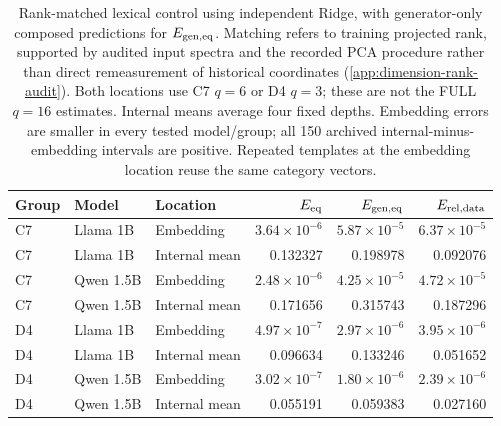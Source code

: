 \begin{table}[t]
\caption{Rank-matched lexical control using independent Ridge, with generator-only composed predictions for $E_{\rm gen,eq}$. Matching refers to training projected rank, supported by audited input spectra and the recorded PCA procedure rather than direct remeasurement of historical coordinates (\cref{app:dimension-rank-audit}). Both locations use C7 $q=6$ or D4 $q=3$; these are not the FULL $q=16$ estimates. Internal means average four fixed depths. Embedding errors are smaller in every tested model/group; all 150 archived internal-minus-embedding intervals are positive. Repeated templates at the embedding location reuse the same category vectors.}
\label{tab:lexical-control}
\centering
\small
\begin{tabular}{lllrrr}
\toprule
Group & Model & Location & $E_{\rm eq}$ & $E_{\rm gen,eq}$ & $E_{\rm rel,data}$ \\
\midrule
C7 & Llama 1B & Embedding & $3.64\!\times\!10^{-6}$ & $5.87\!\times\!10^{-5}$ & $6.37\!\times\!10^{-5}$ \\
C7 & Llama 1B & Internal mean & 0.132327 & 0.198978 & 0.092076 \\
C7 & Qwen 1.5B & Embedding & $2.48\!\times\!10^{-6}$ & $4.25\!\times\!10^{-5}$ & $4.72\!\times\!10^{-5}$ \\
C7 & Qwen 1.5B & Internal mean & 0.171656 & 0.315743 & 0.187296 \\
D4 & Llama 1B & Embedding & $4.97\!\times\!10^{-7}$ & $2.97\!\times\!10^{-6}$ & $3.95\!\times\!10^{-6}$ \\
D4 & Llama 1B & Internal mean & 0.096634 & 0.133246 & 0.051652 \\
D4 & Qwen 1.5B & Embedding & $3.02\!\times\!10^{-7}$ & $1.80\!\times\!10^{-6}$ & $2.39\!\times\!10^{-6}$ \\
D4 & Qwen 1.5B & Internal mean & 0.055191 & 0.059383 & 0.027160 \\
\bottomrule
\end{tabular}
\end{table}
